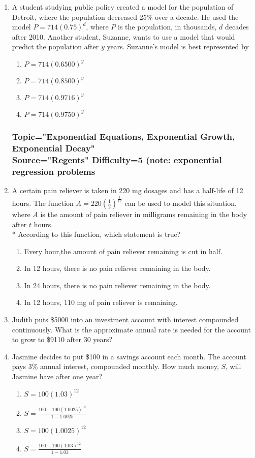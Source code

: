 \documentclass[12pt, oneside]{article}
\begin{document}
\begin{enumerate}
\item A student studying public policy created a model for the population of Detroit, where the population decreased 25\% over a decade. He used the model $P =714(0.75)^d$, where $P$ is the population, in thousands, $d$ decades after 2010. Another student, Suzanne, wants to use a model that would predict the population after $y$ years. Suzanne’s model is best represented by
\begin{enumerate}
    \item $P=714(0.6500)^y$
    \item $P=714(0.8500)^y$
    \item $P=714(0.9716)^y$
    \item $P=714(0.9750)^y$
\end{enumerate}  %


\subsubsection*{Topic="Exponential Equations, Exponential Growth, Exponential Decay"\\
Source="Regents" 
Difficulty=5 (note: exponential regression problems}

\item A certain pain reliever is taken in 220 mg dosages and has a half-life of 12 hours. The function $\displaystyle A = 220 \left( \frac{1}{2} \right) ^\frac{t}{12}$ can be used to model this situation, where $A$ is the amount of pain reliever in milligrams remaining in the body after $t$ hours.\\*
According to this function, which statement is true?
\begin{enumerate}
    \item Every hour,the amount of pain reliever remaining is cut in half. 
    \item In 12 hours, there is no pain reliever remaining in the body.
    \item In 24 hours, there is no pain reliever remaining in the body.
    \item In 12 hours, 110 mg of pain reliever is remaining.
\end{enumerate}

\item Judith puts \$5000 into an investment account with interest compounded continuously. What is the approximate annual rate is needed for the account to grow to \$9110 after 30 years?

\item Jasmine decides to put \$100 in a savings account each month. The account pays 3\% annual interest, compounded monthly. How much money, $S$, will Jasmine have after one year?
\begin{enumerate}
    \item $S=100(1.03)^{12}$
    \item $\displaystyle S=\frac{100-100(1.0025)^{12}}{1-1.0025}$
    \item $S=100(1.0025)^{12}$
    \item $\displaystyle S=\frac{100-100(1.03)^{12}}{1-1.03}$
\end{enumerate} %


\end{enumerate}
\end{document}
